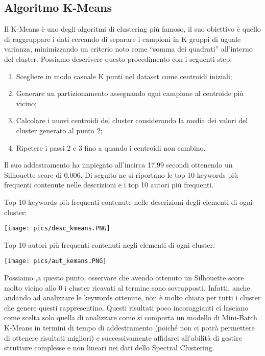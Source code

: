 \documentclass[12pt,oneside]{article}
\begin{document}
    \begin{enumerate}
    \subsection{Algoritmo K-Means}
    \begin{justify}
        Il K-Means è uno degli algoritmi di clustering più famoso, il suo obiettivo è quello di raggruppare i dati cercando di separare i campioni in K gruppi di uguale varianza, minimizzando un criterio noto come “somma dei quadrati” all'interno del cluster. Possiamo descrivere questo procedimento con i seguenti step:
        \begin{enumerate}[label=\arabic*)]
            \item Scegliere in modo casuale K punti nel dataset come centroidi iniziali;
            \item Generare un partizionamento assegnando ogni campione al centroide più vicino;
            \item Calcolare i nuovi centroidi del cluster considerando la media dei valori del cluster generato al punto 2;
            \item Ripetere i passi 2 e 3 fino a quando i centroidi non cambino.
        \end{enumerate}
        Il suo addestramento ha impiegato all’incirca 17.99 secondi ottenendo un Silhouette score di 0.006. Di seguito ne si riportano le top 10 keywords più frequenti contenute nelle descrizioni e i top 10 autori più frequenti.
        \end{justify}

        \hfill
        
        \begin{justify}
        Top 10 keywords più frequenti contenute nelle descrizioni degli elementi di ogni cluster:
        \end{justify}

        \texttt{[image: pics/desc\_kmeans.PNG]}
        
        \begin{justify}
        Top 10 autori più frequenti contenuti negli elementi di ogni cluster:
        \end{justify}

        \texttt{[image: pics/aut\_kemans.PNG]}
        
        \begin{justify}
        Possiamo ,a questo punto, osservare che avendo ottenuto un Silhouette score molto vicino allo 0 i cluster ricavati al termine sono sovrapposti. Infatti, anche andando ad analizzare le keywords ottenute, non è molto chiaro per tutti i cluster che genere questi rappresentino. Questi risultati poco incoraggianti ci lasciano come scelta solo quella di analizzare come si comporta un modello di Mini-Batch K-Means in termini di tempo di addestramento (poiché non ci potrà permettere di ottenere risultati migliori) e successivamente affidarci all’abilità di gestire strutture complesse e non lineari nei dati dello Spectral Clustering.
    \end{justify}
    \end{enumerate}
\end{document}
